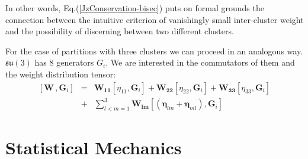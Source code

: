 \documentclass[twocolumn,aps,sort,nofootinbib]{revtex4}
\begin{document}
In other words, Eq.(\ref{JzConservation-bisec}) puts on formal grounds the connection
between the intuitive criterion of vanishingly small inter-cluster weight
and the possibility of discerning between two different clusters.
 
For the case of partitions with three clusters we can proceed in an analogous way.
$\mathfrak{su}(3)$ has $8$ generators ${G_i}$. We are interested in the commutators of them and the weight distribution tensor:
\begin{eqnarray}
	\left[\boldsymbol{W}\,,\boldsymbol{G}_i\right] &=& 
	\boldsymbol{W_{11}}\left[\eta_{11},\boldsymbol{G}_i\right] +\boldsymbol{W_{22}}\left[\eta_{22},\boldsymbol{G}_i\right]+
	\boldsymbol{W_{33}}\left[\eta_{33},\boldsymbol{G}_i\right]\nonumber\\
	&+&\sum_{l<m=1}^3\boldsymbol{W_{lm}}\left[\left(\boldsymbol{\eta}_{lm}+\boldsymbol{\eta}_{ml}\right),\boldsymbol{G}_i\right]
\end{eqnarray}

\section{Statistical Mechanics\label{secStatMech}}
\end{document}
